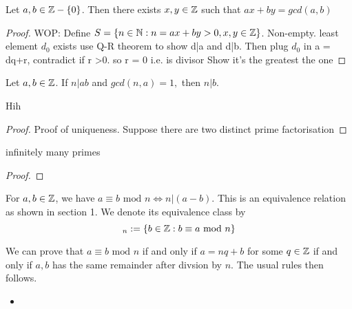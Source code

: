 \documentclass[11pt]{article}
\begin{document}
\begin{theorem}
  Let \(a,b \in \mathbb{Z} - \{0\}\). Then there exists \(x,y \in \mathbb{Z}\) such that \(ax+by=gcd(a,b)\)
\end{theorem}
\begin{proof}
  WOP: Define \(S=\{ n \in \mathbb{N} : n=ax+by >0 , x,y \in \mathbb{Z} \}\).
  Non-empty.
  least element \(d_0\) exists
  use Q-R theorem to show d|a and d|b. Then plug \(d_0\) in a = dq+r, contradict if r >0. so r = 0 i.e. is divisor
  Show it's the greatest the one
\end{proof}
\begin{corollary}
  Let \(a,b \in \mathbb{Z}\). If \(n|ab\) and \(gcd(n,a)=1,\) then \(n|b\).
\end{corollary}


\begin{theorem}
Hih
\end{theorem}
\begin{proof}
  Proof of uniqueness.
  Suppose there are two distinct prime factorisation
\end{proof}

\begin{theorem}
  infinitely many primes
\end{theorem}
\begin{proof}
  
\end{proof}

\begin{definition}
  For \(a,b \in \mathbb{Z}\), we have \(a \equiv b \text{ mod } n \iff n|(a-b)\). This is an equivalence relation as shown in section 1.
  We denote its equivalence class by
  \begin{equation*}
    [a]_n := \{b \in \Z : b \equiv a \text{ mod } n\}
  \end{equation*}
\end{definition}

We can prove that \(a \equiv b \text{ mod } n\) if and only if \(a=nq+b\) for some \(q \in \mathbb{Z}\) if and only if \(a,b\) has the same remainder after divsion by \(n\). The usual rules then follows.

\begin{proposition}
  \begin{itemize}
    \item 
  \end{itemize}
\end{proposition}
\end{document}
